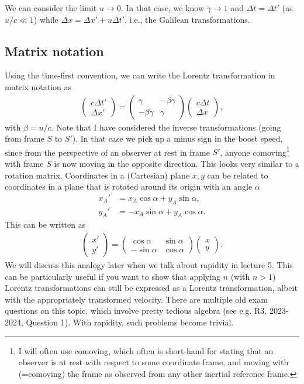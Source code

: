 \documentclass[12pt]{article}
\newcommand{\be}{\begin{eqnarray}}
\newcommand{\ee}{\end{eqnarray}}
\begin{document}
We can consider the limit $u\rightarrow 0$. In that case, we know $\gamma \rightarrow 1$ and $\Delta t = \Delta t'$ (as $u/c \ll 1$) while $\Delta x = \Delta x' + u \Delta t'$, i.e., the Galilean transformations.

\subsection{Matrix notation}
Using the time-first convention, we can write the Lorentz transformation in matrix notation as
\be
\begin{pmatrix}
c\Delta t' \\
\Delta x'
\end{pmatrix} =
\begin{pmatrix}
\gamma & -\beta \gamma \\
-\beta \gamma  & \gamma
\end{pmatrix}\begin{pmatrix}
c\Delta t \\
\Delta x
\end{pmatrix},
\ee
with $\beta = u/c$.  Note that I have considered the inverse transformations (going from frame $S$ to $S'$). In that case we pick up a minus sign in the boost speed, since from the perspective of an observer at rest in frame $S'$, anyone comoving\footnote{I will often use comoving, which often is short-hand for stating that an observer is at rest with respect to some coordinate frame, and moving with (=comoving) the frame as observed from any other inertial reference frame.} with frame $S$ is now moving in the opposite direction.
This looks very similar to a rotation matrix. Coordinates in a (Cartesian) plane $x,y$ can be related to coordinates in a plane that is rotated around its origin with an angle $\alpha$
\begin{align*}
x_A' &= x_A \cos \alpha + y_A \sin \alpha, \\
y_A' &= -x_A \sin \alpha + y_A \cos \alpha.
\end{align*}
This can be written as
\be
\begin{pmatrix}
x' \\
y'
\end{pmatrix} =
\begin{pmatrix}
\cos \alpha &  \sin \alpha \\
-\sin \alpha & \cos \alpha
\end{pmatrix}
\begin{pmatrix}
x \\
y
\end{pmatrix}.
\ee
We will discuss this analogy later when we talk about rapidity in lecture 5. This can be particularly useful if you want to show that applying $n$ (with $n>1$) Lorentz transformations can still be expressed as a Lorentz transformation, albeit with the appropriately transformed velocity. There are multiple old exam questions on this topic, which involve pretty tedious algebra (see e.g. R3, 2023-2024, Question 1). With rapidity, such problems become trivial.
\end{document}
